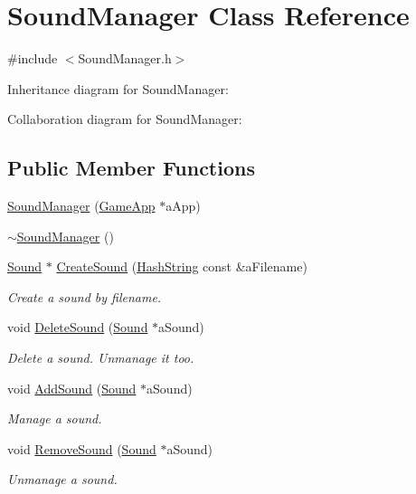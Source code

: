 \hypertarget{classSoundManager}{}\section{Sound\+Manager Class Reference}
\label{classSoundManager}


{\ttfamily \#include $<$Sound\+Manager.\+h$>$}



Inheritance diagram for Sound\+Manager\+:


Collaboration diagram for Sound\+Manager\+:
\subsection*{Public Member Functions}
\begin{DoxyCompactItemize}
\item 
\hyperlink{classSoundManager_ac95690478a472eae74da4e39907be0dd}{Sound\+Manager} (\hyperlink{classGameApp}{Game\+App} $\ast$a\+App)
\item 
\hyperlink{classSoundManager_ad5dbf8eab22db48ff8f3db51b02f8938}{$\sim$\+Sound\+Manager} ()
\item 
\hyperlink{classSound}{Sound} $\ast$ \hyperlink{classSoundManager_a721516d27886661cd9198c557ce92780}{Create\+Sound} (\hyperlink{classHashString}{Hash\+String} const \&a\+Filename)
\begin{DoxyCompactList}\small\item\em Create a sound by filename. \end{DoxyCompactList}\item 
void \hyperlink{classSoundManager_aadec3988edc8081e43cf603497438abe}{Delete\+Sound} (\hyperlink{classSound}{Sound} $\ast$a\+Sound)
\begin{DoxyCompactList}\small\item\em Delete a sound. Unmanage it too. \end{DoxyCompactList}\item 
void \hyperlink{classSoundManager_a3001bab42ffa43851f66d53179d3e3e1}{Add\+Sound} (\hyperlink{classSound}{Sound} $\ast$a\+Sound)
\begin{DoxyCompactList}\small\item\em Manage a sound. \end{DoxyCompactList}\item 
void \hyperlink{classSoundManager_afeff36e880342fe89ac87d29ef8b64a5}{Remove\+Sound} (\hyperlink{classSound}{Sound} $\ast$a\+Sound)
\begin{DoxyCompactList}\small\item\em Unmanage a sound. \end{DoxyCompactList}\item 

\end{DoxyCompactItemize}
